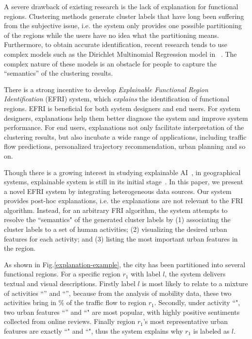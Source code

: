 \documentclass[runningheads]{llncs}
\begin{document}
A severe drawback of existing research is the lack of explanation for functional regions.
Clustering methods generate cluster labels that have long been suffering from the subjective issue, i.e. the system only provides one possible partitioning of the regions while the users have no idea what the partitioning means. 
Furthermore, to obtain accurate identification, recent research tends to use complex models such as the Dirichlet Multinomial Regression model in~\cite{Yuan2015FunctionRegion} . 
The complex nature of these models is an obstacle for people to capture the ``semantics'' of the clustering results. 

There is a strong incentive to develop  \emph{Explainable Functional Region Identification} (EFRI) system, which \emph{explains} the identification of functional regions. 
EFRI is beneficial for both system designers and end users.
For system designers, explanations help them better diagnose the system and improve system performance. 
For end users, explanations not only facilitate interpretation of the clustering results, but also incubate a wide range of applications, including traffic flow predictions, personalized trajectory recommendation, urban planning and so on. 

Though there is a growing interest in studying explainable AI~\cite{Preece2018ExplainAI}, in geographical systems, explainable system is still in its initial stage~\cite{Korpan2017navigation,Jose2018cognitive}.
In this paper, we present a novel EFRI system by integrating heterogeneous data sources. Our system provides post-hoc explanations, i.e. the explanations are not relevant to the FRI algorithm. Instead, for an arbitrary FRI algorithm, the system attempts to resolve the ``semantics" of the generated cluster labels by (1) associating the cluster labels to a set of human activities; (2) visualizing the desired urban features for each activity; and (3) listing the most important urban features in the region. 

As shown in Fig.\ref{explanation-example}, the city has been partitioned into several functional regions. For a specific region $r_1$ with label $l$, the system delivers textual and visual descriptions. Firstly label $l$ is most likely to relate to a mixture of activities ``'' and ``'', because from the analysis of mobility data, these two activities bring in $\%$ of the traffic flow to region $r_1$. Secondly, under activity ``", two urban features ``'' and ``" are most popular, with highly positive sentiments collected from online reviews. Finally region $r_1$'s most representative urban features are exactly ``" and ``", thus the system explains why $r_1$ is labeled as $l$.  
\end{document}
